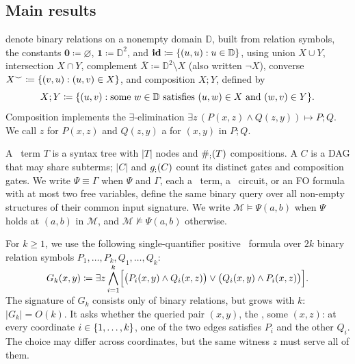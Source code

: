 \subsection{Main results}\label{sec:main-results}

\def\cordom{\mathbb{D}}

 denote binary relations on a nonempty domain $\cordom$,
built from relation symbols,
the constants
$\mathbf{0} \coloneqq \varnothing$, 
$\mathbf{1} \coloneqq \cordom^2$,
and $\id \coloneqq \set{(u,u) : u\in \cordom}$,
using union $X \cup Y$, intersection $X \cap Y$, 
complement $\overline X \coloneqq \cordom^2\setminus X$ (also written $\neg X$),
converse $X^\smile \coloneqq \{ (v,u):(u,v)\in X \}$, and composition $X;Y$, defined by
\[
X;Y \coloneqq \set{(u,v):\text{some }w\in\cordom\text{ satisfies }
 (u,w)\in X \text{ and } (w,v)\in Y}.
\]
Composition implements the $\exists$-elimination
$\exists z\,(P(x,z)\land Q(z,y)) \mapsto P;Q$.
We call $z$ for $P(x,z)$ and $Q(z,y)$ a  for $(x,y)$ in $P ; Q$.

\smallskip
{}
A \CoR\ term $T$ is a syntax tree with $|T|$ nodes and $\#_{;}(T)$ compositions.
A  $C$ is a DAG that may share subterms;
$|C|$ and $g_{;}(C)$ count its distinct gates and composition gates.
We write $\Psi\equiv\Gamma$
when $\Psi$ and $\Gamma$,
each a \CoR\ term, a \CoR\ circuit, or an FO formula
with at most two free variables,
define the same binary query over all non-empty structures of their common input signature.
%
We write $\mathcal M\models\Psi(a,b)$ when $\Psi$ holds at $(a,b)$ in $\mathcal M$, and $\mathcal M\not\models\Psi(a,b)$ otherwise.

\smallskip
{}
For $k \geq 1$,
we use the following single-quantifier positive \FOthree\ formula over $2k$ binary relation symbols $P_1,\ldots,P_k,Q_1,\ldots,Q_k$:
\[
 G_k(x,y)\coloneqq\exists z\,\smash{\bigwedge_{i=1}^k}
 \Bigl[\bigl(P_i(x,y)\land Q_i(x,z)\bigr)\lor\bigl(Q_i(x,y)\land P_i(x,z)\bigr)\Bigr].
\]
The signature of $G_k$ consists only of binary relations, but grows with $k$: $|G_k| = O(k)$.
It asks whether the queried pair $(x,y)$, the ,  some  $(x,z)$: at every coordinate $i\in\{ 1,\ldots,k \}$, one of the two edges satisfies $P_i$ and the other $Q_i$.
The choice may differ across coordinates, but the same witness $z$ must serve all of them.

